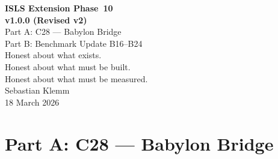 \documentclass[11pt,a4paper,twoside]{article}
\theoremstyle{definition}
\theoremstyle{plain}
\theoremstyle{remark}
\newcommand{\ISLS}{\textsf{ISLS}}
\begin{document}
\begin{titlepage}
\centering
\vspace*{2cm}
{\Huge\bfseries \ISLS{} Extension Phase~10\\[0.3cm]
v1.0.0 (Revised v2)}\\[1.5cm]
{\Large Part A: C28 --- Babylon Bridge\\
Part B: Benchmark Update B16--B24}\\[1cm]
{\large Honest about what exists.\\
Honest about what must be built.\\
Honest about what must be measured.}\\[2cm]
{\large Sebastian Klemm}\\[0.5cm]
{\large 18 March 2026}

\begin{abstract}
\noindent
\textbf{Part A} integrates the Babylon Compiler's IR layer
(\texttt{glyph-ir}, \texttt{glyph-embed}, \texttt{glyph-canon})
as a structural validation and type-consistency backbone for the
Forge. The Oracle (C25) still generates code --- but now against
an IR-derived structural contract. Codegen backends are \textbf{not}
claimed to exist in Babylon or Merkaba; they are specified here as
new code that must be written. Six backends (Rust, TypeScript,
Python, SQL, YAML/Docker, Markdown) emit from IR structure + Oracle
content.

\textbf{Part B} extends the benchmark suite from B01--B15 (core
pipeline) to B16--B24, covering: Oracle synthesis latency, Oracle
rejection rate, Pattern Memory hit rate, Foundry compilation success
rate, Foundry average attempts, Template match accuracy, Studio
endpoint latency, full forge-to-project throughput, and autonomy
ratio over time.

\medskip\noindent\textbf{Status:} Implementation Specification.\\
\textbf{New Crate:} C28 (\texttt{isls-multilang}).\\
\textbf{Depends on:} C22, C23, C25, C26, C27;
  Babylon: \texttt{glyph-ir}, \texttt{glyph-embed},
  \texttt{glyph-canon}, \texttt{glyph-q16}.
\end{abstract}
\end{titlepage}

\tableofcontents
\newpage


\part{Part A: C28 --- Babylon Bridge}\label{part:bridge}
\end{document}
